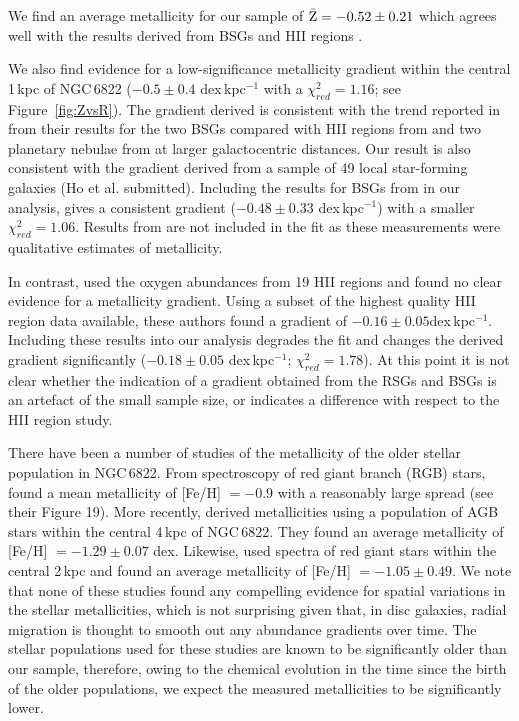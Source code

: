 We find an average metallicity for our sample of $\bar{\rm Z}=-0.52\pm 0.21$
which agrees well with the results derived from BSGs
\citep{1999A&A...352L..40M,2001ApJ...547..765V,Przybilla02} and HII regions
\citep{2006ApJ...642..813L}.

We also find evidence for a low-significance metallicity gradient within the central 1\,kpc of NGC\,6822
($-0.5\pm0.4$ dex\,kpc$^{-1}$ with a $\chi^{2}_{red}=1.16$; see Figure~\ref{fig:ZvsR}).
The gradient derived is consistent with the trend reported in
\cite{2001ApJ...547..765V}
from their results for the two BSGs compared with HII regions from
\cite{1980MNRAS.193..219P} and two planetary nebulae from
\cite{1995ApJ...445..642R} at larger galactocentric distances.
Our result is also consistent with the gradient derived from a sample of 49 local star-forming galaxies
(Ho et al. submitted).
Including the results for BSGs from
\cite{2001ApJ...547..765V}
in our analysis,
gives a consistent gradient
($-0.48\pm 0.33$ dex\,kpc$^{-1}$)
with a smaller
$\chi^{2}_{red}=1.06$.
Results from
\cite{1999A&A...352L..40M} are not included in the fit as these measurements were qualitative estimates of metallicity.

In contrast,
\cite{2006ApJ...642..813L} used the oxygen abundances from 19 HII
regions and found no clear evidence for a metallicity gradient.
Using a subset of the highest quality HII
region data available, these authors found a gradient of
$-0.16\pm0.05$dex\,kpc$^{-1}$.
Including these results into our analysis degrades the fit and changes the derived gradient significantly
($-0.18\pm0.05$ dex\,kpc$^{-1}$; $\chi^{2}_{red}=1.78$).
At this point it is not clear whether the indication of a gradient obtained from the RSGs and BSGs is an artefact of the small sample size,
or indicates a difference with respect to the HII region study.


There have been a number of studies of the metallicity of the older stellar population in NGC\,6822.
From spectroscopy of red giant branch (RGB) stars,
\cite{2001MNRAS.327..918T} found a mean metallicity of [Fe/H] $=-0.9$
with a reasonably large spread (see their Figure 19).
More recently,
\cite{2012A&A...540A.135S} derived metallicities using a population of AGB stars within the central 4\,kpc of NGC\,6822.
They found an average metallicity of [Fe/H] $=-1.29\pm0.07$ dex.
Likewise,
\cite{2013ApJ...779..102K}
used spectra of red giant stars within the central 2\,kpc and found an average metallicity of
[Fe/H] $=-1.05\pm0.49$.
We note that none of these studies found any compelling evidence for spatial variations in the stellar metallicities,
which is not surprising given that, in disc galaxies, radial migration is thought to smooth out any abundance gradients over time.
The stellar populations used for these studies are known to be significantly older than our sample,
therefore, owing to the chemical evolution in the time since the birth of the older populations,
we expect the measured metallicities to be significantly lower.

